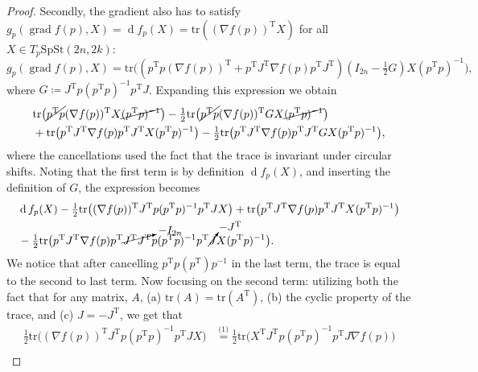 \begin{proof}
    Secondly, the gradient also has to satisfy $g_{p}(\operatorname{grad}f(p),X)=\operatorname{d}f_p(X)=\mathrm{tr}((\nabla f(p))^\mathrm{T}X)$ for all $X\in T_{p}\mathrm{SpSt}(2n, 2k)$:
    $$g_{p}(\operatorname{grad}f(p),X)=\mathrm{tr}\big((p^{\mathrm{T}}p (\nabla f(p))^{\mathrm{T}}+p ^{\mathrm{T}}J ^{\mathrm{T}}\nabla f(p)p ^{\mathrm{T}}J ^{\mathrm{T}})(I_{2n}- \tfrac{1}{2}G)X(p ^{\mathrm{T}}p)^{-1}\big),$$
    where $G \coloneqq J ^{\mathrm{T}}p(p ^{\mathrm{T}}p)^{-1}p ^{\mathrm{T}}J$. Expanding this expression we obtain
    \begin{align}
    &\mathrm{tr}\big(\cancel{p ^{\mathrm{T}}p}(\nabla f(p)) ^{\mathrm{T}}X\cancel{(p ^{\mathrm{T}}p)^{-1}}\big)- \tfrac{1}{2}\mathrm{tr}\big(\cancel{p ^{\mathrm{T}}p}(\nabla f(p)) ^{\mathrm{T}}GX\cancel{(p ^{\mathrm{T}}p)^{-1}}\big)\\
    &+\mathrm{tr}\big(p ^{\mathrm{T}}J ^{\mathrm{T}} \nabla f(p)p ^{\mathrm{T}}J ^{\mathrm{T}}X (p ^{\mathrm{T}}p)^{-1}\big)- \tfrac{1}{2}\mathrm{tr}\big(p ^{\mathrm{T}}J ^{\mathrm{T}}\nabla f(p)p ^{\mathrm{T}}J ^{\mathrm{T}}GX(p ^{\mathrm{T}}p)^{-1}\big),
    \end{align}
    where the cancellations used the fact that the trace is invariant under circular shifts. Noting that the first term is by definition $\operatorname{d}f_{p}(X)$, and inserting the definition of $G$, the expression becomes
    \begin{align}
    &\operatorname{d}f_{p}(X)- \tfrac{1}{2} \mathrm{tr}\big((\nabla f(p)) ^{\mathrm{T}}J ^{\mathrm{T}}p(p ^{\mathrm{T}}p)^{-1}p ^{\mathrm{T}}JX\big)+\mathrm{tr}\big(p ^{\mathrm{T}}J ^{\mathrm{T}}\nabla f(p) p ^{\mathrm{T}}J ^{\mathrm{T}}X(p ^{\mathrm{T}}p)^{-1}\big)\\
    &- \tfrac{1}{2} \mathrm{tr}\big(p ^{\mathrm{T}}J ^{\mathrm{T}}\nabla f(p)p ^{\mathrm{T}}\cancelto{-I_{2n}}{J ^{\mathrm{T}}J ^{\mathrm{T}}}p(p ^{\mathrm{T}}p)^{-1}p ^{\mathrm{T}}\cancelto{-J ^{\mathrm{T}}}{J}X(p ^{\mathrm{T}}p)^{-1}\big).
    \end{align}
    We notice that after cancelling $p ^{\mathrm{T}}p(p ^{\mathrm{T}})p^{-1}$ in the last term, the trace is equal to the second to last term. Now focusing on the second term: utilizing both the fact that for any matrix, $A$, (a) $\mathrm{tr}(A)=\mathrm{tr}(A ^{\mathrm{T}})$, (b) the cyclic property of the trace, and (c) $J=-J ^{\mathrm{T}}$, we get that 
    \begin{align}
    \tfrac{1}{2} \mathrm{tr}\big((\nabla f(p)) ^{\mathrm{T}}J ^{\mathrm{T}}p(p ^{\mathrm{T}}p)^{-1}p ^{\mathrm{T}}JX\big)&\overset{\text{(1)}}{=}\tfrac{1}{2} \mathrm{tr}\big(X ^{\mathrm{T}}J ^{\mathrm{T}}p (p ^{\mathrm{T}}p)^{-1}p ^{\mathrm{T}}J \nabla f(p)\big)\\

\end{align}
\end{proof}
